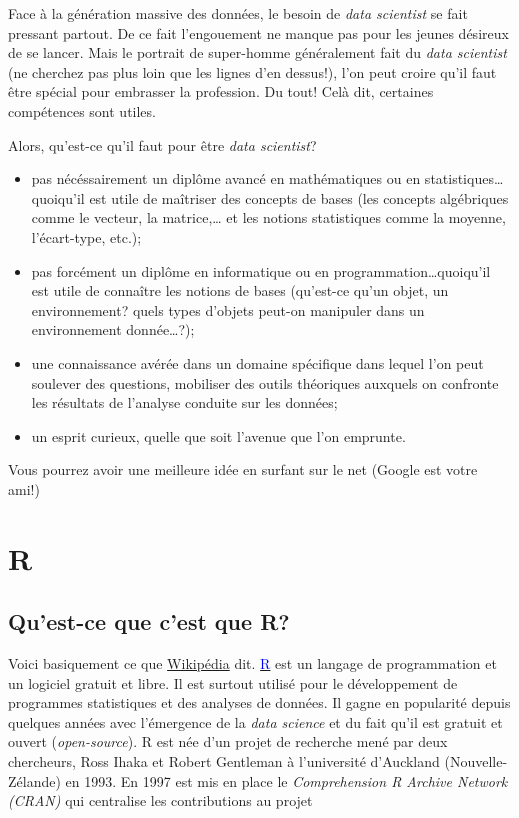 \documentclass[]{book}
\begin{document}
Face à la génération massive des données, le besoin de \emph{data
scientist} se fait pressant partout. De ce fait l'engouement ne manque
pas pour les jeunes désireux de se lancer. Mais le portrait de
super-homme généralement fait du \emph{data scientist} (ne cherchez pas
plus loin que les lignes d'en dessus!), l'on peut croire qu'il faut être
spécial pour embrasser la profession. Du tout! Celà dit, certaines
compétences sont utiles.

Alors, qu'est-ce qu'il faut pour être \emph{data scientist}?

\begin{itemize}
\item
  pas nécéssairement un diplôme avancé en mathématiques ou en
  statistiques\ldots{}quoiqu'il est utile de maîtriser des concepts de
  bases (les concepts algébriques comme le vecteur, la matrice,\ldots{}
  et les notions statistiques comme la moyenne, l'écart-type, etc.);
\item
  pas forcément un diplôme en informatique ou en
  programmation\ldots{}quoiqu'il est utile de connaître les notions de
  bases (qu'est-ce qu'un objet, un environnement? quels types d'objets
  peut-on manipuler dans un environnement donnée\ldots{}?);
\item
  une connaissance avérée dans un domaine spécifique dans lequel l'on
  peut soulever des questions, mobiliser des outils théoriques auxquels
  on confronte les résultats de l'analyse conduite sur les données;
\item
  un esprit curieux, quelle que soit l'avenue que l'on emprunte.
\end{itemize}

Vous pourrez avoir une meilleure idée en surfant sur le net (Google est
votre ami!)

\section{R}\label{r}

\subsection{Qu'est-ce que c'est que R?}\label{quest-ce-que-cest-que-r}

Voici basiquement ce que
\href{https://fr.wikipedia.org/wiki/R_(langage)}{Wikipédia} dit.
\href{http://r-project.org}{\textcolor{blue}{R}} est un langage de
programmation et un logiciel gratuit et libre. Il est surtout utilisé
pour le développement de programmes statistiques et des analyses de
données. Il gagne en popularité depuis quelques années avec l'émergence
de la \emph{data science} et du fait qu'il est gratuit et ouvert
(\emph{open-source}). R est née d'un projet de recherche mené par deux
chercheurs, Ross Ihaka et Robert Gentleman à l'université d'Auckland
(Nouvelle-Zélande) en 1993. En 1997 est mis en place le
\emph{Comprehension R Archive Network (CRAN)} qui centralise les
contributions au projet
\end{document}
